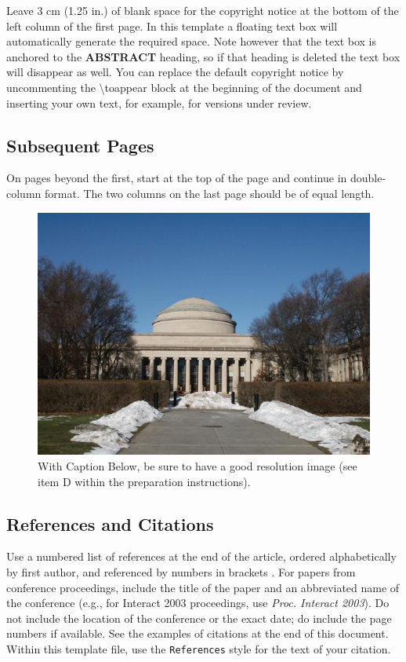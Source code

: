 \documentclass{sigchi}
\begin{document}
Leave 3 cm (1.25 in.) of blank space for the copyright notice at the
bottom of the left column of the first page. In this template a
floating text box will automatically generate the required space. Note
however that the text box is anchored to the \textbf{ABSTRACT}
heading, so if that heading is deleted the text box will disappear as
well. You can replace the default copyright notice by uncommenting
the {\textbackslash}toappear block at the beginning of the document
and inserting your own text, for example, for versions under review.


\subsection{Subsequent Pages}

On pages beyond the first, start at the top of the page and continue
in double-column format. The two columns on the last page should be
of equal length.

\begin{figure}[!h]
\centering
\includegraphics[width=0.9\columnwidth]{Figure1}
\caption{With Caption Below, be sure to have a good resolution image
(see item D within the preparation instructions).}
\label{fig:figure1}
\end{figure}

\subsection{References and Citations}

Use a numbered list of references at the end of the article, ordered
alphabetically by first author, and referenced by numbers in brackets
\cite{ethics,
Klemmer:2002:WSC:503376.503378,
Mather:2000:MUT,
Zellweger:2001:FAO:504216.504224}. For
papers from conference proceedings, include the title of the paper and
an abbreviated name of the conference (e.g., for Interact 2003
proceedings, use \textit{Proc. Interact 2003}). Do not include the
location of the conference or the exact date; do include the page
numbers if available. See the examples of citations at the end of this
document. Within this template file, use the \texttt{References} style
for the text of your citation.
\end{document}
